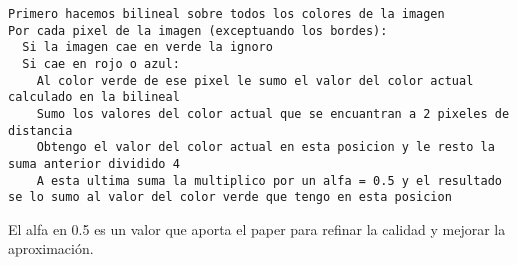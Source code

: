 \begin{lstlisting}[frame=single] 
Primero hacemos bilineal sobre todos los colores de la imagen
Por cada pixel de la imagen (exceptuando los bordes):
  Si la imagen cae en verde la ignoro 
  Si cae en rojo o azul:
    Al color verde de ese pixel le sumo el valor del color actual calculado en la bilineal
    Sumo los valores del color actual que se encuantran a 2 pixeles de distancia 
    Obtengo el valor del color actual en esta posicion y le resto la suma anterior dividido 4
    A esta ultima suma la multiplico por un alfa = 0.5 y el resultado se lo sumo al valor del color verde que tengo en esta posicion
\end{lstlisting}

El alfa en 0.5 es un valor que aporta el paper para refinar la calidad y mejorar la aproximación.